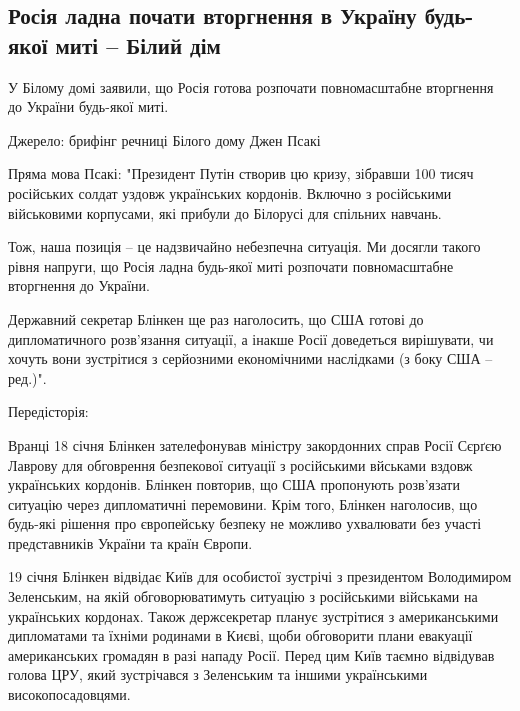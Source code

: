  
 
 
 
 
\subsection{Росія ладна почати вторгнення в Україну будь-якої миті – Білий дім}
\label{sec:18_01_2022.stz.news.ua.pravda.1.rossia_ugroza}


У Білому домі заявили, що Росія готова розпочати повномасштабне вторгнення до
України будь-якої миті.

Джерело: брифінг речниці Білого дому Джен Псакі

Пряма мова Псакі: "Президент Путін створив цю кризу, зібравши 100 тисяч
російських солдат уздовж українських кордонів. Включно з російськими
військовими корпусами, які прибули до Білорусі для спільних навчань.

Тож, наша позиція – це надзвичайно небезпечна ситуація. Ми досягли такого рівня
напруги, що Росія ладна будь-якої миті розпочати повномасштабне вторгнення до
України.

Державний секретар Блінкен ще раз наголосить, що США готові до дипломатичного
розв’язання ситуації, а інакше Росії доведеться вирішувати, чи хочуть вони
зустрітися з серйозними економічними наслідками (з боку США – ред.)".

Передісторія: 

Вранці 18 січня Блінкен зателефонував міністру закордонних справ Росії
Сєрґєю Лаврову для обговрення безпекової ситуації з російськими вйськами
вздовж українських кордонів. Блінкен повторив, що США пропонують розв’язати
ситуацію через дипломатичні перемовини. Крім того, Блінкен наголосив, що
будь-які рішення про європейську безпеку не можливо ухвалювати без участі
представників України та країн Європи.

19 січня Блінкен відвідає Київ для особистої зустрічі з президентом
Володимиром Зеленським, на якій обговорюватимуть ситуацію з російськими
військами на українських кордонах. Також держсекретар планує зустрітися з
американськими дипломатами та їхніми родинами в Києві, щоби обговорити
плани евакуації американських громадян в разі нападу Росії. Перед цим Київ
таємно відвідував голова ЦРУ, який зустрічався з Зеленським та іншими
українськими високопосадовцями.

